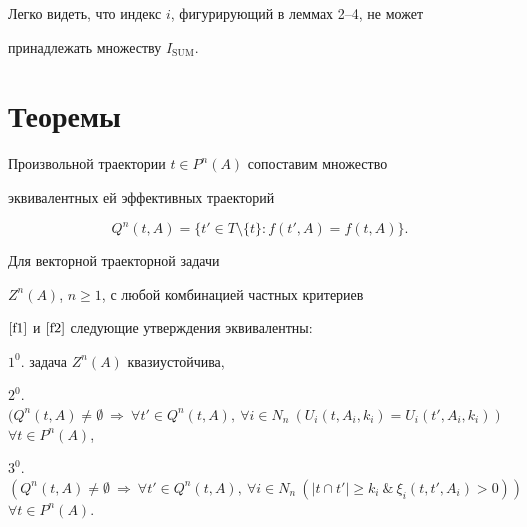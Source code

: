 \begin{note}


Легко видеть, что индекс $i$, фигурирующий в леммах 2--4, не может


принадлежать множеству $I_{\mathrm{SUM}}$.


\end{note}








\section{Теоремы}





Произвольной траектории $t \in P^n(A)$ сопоставим множество


эквивалентных ей эффективных траекторий


$$


Q^n(t, A)=\{ t'\in T\setminus \{t\} : f(t', A)= f(t, A) \}.


$$





\begin{thm} Для векторной траекторной задачи


$Z^n(A)$, $n \geq 1$, с любой комбинацией частных критериев


$\eqref{f1}$ и $\eqref{f2}$ следующие утверждения эквивалентны\/${:}$





$1^0$. задача $Z^n(A)$ квазиустойчива,





$2^0$.   $( Q^n(t, A) \neq \emptyset


\ \Rightarrow \ \forall t'\in


Q^n(t, A), \ \forall i \in N_n \ (U_i(t, A_i, k_i)=U_i(t',


A_i, k_i))$ \; $\forall t\in P^n(A)$,





$3^0$.   $(Q^n(t, A) \neq \emptyset


\ \Rightarrow \ \forall t' \in


Q^n(t, A), \ \forall i\in N_n \ (|t \cap t'| \geq k_i \ \& \


\xi_i(t, t', A_i)>0))$ \; $\forall t\in P^n(A)$.


\end{thm}






